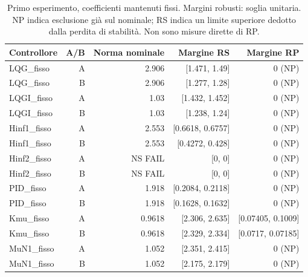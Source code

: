\begin{table}[htbp]\centering\small
\setlength{\tabcolsep}{4pt}
\begin{tabular}{lrrrr}\toprule
Controllore & A/B & Norma nominale & Margine RS & Margine RP\\\midrule
LQG\_fisso & A & \num{2.906} & [\num{1.471}, \num{1.49}] & 0 (NP)\\
LQG\_fisso & B & \num{2.906} & [\num{1.277}, \num{1.28}] & 0 (NP)\\
LQGI\_fisso & A & \num{1.03} & [\num{1.432}, \num{1.452}] & 0 (NP)\\
LQGI\_fisso & B & \num{1.03} & [\num{1.238}, \num{1.24}] & 0 (NP)\\
Hinf1\_fisso & A & \num{2.553} & [\num{0.6618}, \num{0.6757}] & 0 (NP)\\
Hinf1\_fisso & B & \num{2.553} & [\num{0.4272}, \num{0.428}] & 0 (NP)\\
Hinf2\_fisso & A & NS FAIL & [\num{0}, \num{0}] & 0 (NP)\\
Hinf2\_fisso & B & NS FAIL & [\num{0}, \num{0}] & 0 (NP)\\
PID\_fisso & A & \num{1.918} & [\num{0.2084}, \num{0.2118}] & 0 (NP)\\
PID\_fisso & B & \num{1.918} & [\num{0.1628}, \num{0.1632}] & 0 (NP)\\
Kmu\_fisso & A & \num{0.9618} & [\num{2.306}, \num{2.635}] & [\num{0.07405}, \num{0.1009}]\\
Kmu\_fisso & B & \num{0.9618} & [\num{2.329}, \num{2.334}] & [\num{0.0717}, \num{0.07185}]\\
MuN1\_fisso & A & \num{1.052} & [\num{2.351}, \num{2.415}] & 0 (NP)\\
MuN1\_fisso & B & \num{1.052} & [\num{2.175}, \num{2.179}] & 0 (NP)\\
\bottomrule\end{tabular}
\caption{Primo esperimento, coefficienti mantenuti fissi. Margini robusti: soglia unitaria. NP indica esclusione già sul nominale; RS indica un limite superiore dedotto dalla perdita di stabilità. Non sono misure dirette di RP.}
\end{table}
